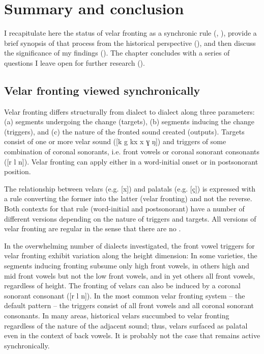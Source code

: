 \chapter{Summary and conclusion}\label{sec:18}

I recapitulate here the status of velar fronting as a synchronic rule (, ), provide a brief synopsis of that process from the historical perspective (), and then discuss the significance of my findings (). The chapter concludes  with a series of questions I leave open for further research ().

\section{{Velar} {fronting} {viewed} {synchronically}}\label{sec:18.1}

Velar fronting differs structurally from dialect to dialect along three parameters: (a) segments undergoing the change (targets), (b) segments inducing the change (triggers), and (c) the nature of the fronted sound created (outputs). Targets consist of one or more velar sound ([k g kx x ɣ ŋ]) and triggers of some combination of coronal sonorants, i.e. front vowels or coronal sonorant consonants ([r l n]). Velar fronting can apply either in a word-initial onset or in postsonorant position.

The relationship between velars (e.g. [x]) and palatals (e.g. [ç]) is expressed with a rule  converting the former into the latter (velar fronting) and not the reverse. Both contexts for that rule (word-initial and postsonorant) have a number of different versions depending on the nature of triggers and targets. All versions of velar fronting are regular in the sense that there are no .

In the overwhelming number of dialects investigated, the front vowel triggers for velar fronting exhibit variation along the height dimension: In some varieties, the segments inducing fronting subsume only high front vowels, in others high and mid front vowels but not the low front vowels, and in yet others all front vowels, regardless of height. The fronting of velars can also be induced by a coronal sonorant consonant ([r l n]). In the most common velar fronting system -- the default pattern -- the triggers consist of all front vowels and all coronal sonorant consonants. In many areas, historical velars succumbed to velar fronting regardless of the nature of the adjacent sound; thus, velars surfaced as palatal even in the context of back vowels. It is probably not the case that  remains active synchronically.

